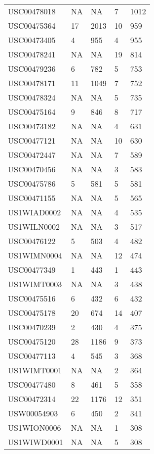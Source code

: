 \begin{center}
\begin{longtable}{l l l l l}
				\endfoot
					\hline
				\endlastfoot
				  USC00478018 & NA & NA &   7 & 1012 \\ 
				  USC00475364 &  17 & 2013 &  10 & 959 \\ 
				  USC00473405 &   4 & 955 &   4 & 955 \\ 
				  USC00478241 & NA & NA &  19 & 814 \\ 
				  USC00479236 &   6 & 782 &   5 & 753 \\ 
				  USC00478171 &  11 & 1049 &   7 & 752 \\ 
				  USC00478324 & NA & NA &   5 & 735 \\ 
				  USC00475164 &   9 & 846 &   8 & 717 \\ 
				  USC00473182 & NA & NA &   4 & 631 \\ 
				  USC00477121 & NA & NA &  10 & 630 \\ 
				  USC00472447 & NA & NA &   7 & 589 \\ 
				  USC00470456 & NA & NA &   3 & 583 \\ 
				  USC00475786 &   5 & 581 &   5 & 581 \\ 
				  USC00471155 & NA & NA &   5 & 565 \\ 
				  US1WIAD0002 & NA & NA &   4 & 535 \\ 
				  US1WILN0002 & NA & NA &   3 & 517 \\ 
				  USC00476122 &   5 & 503 &   4 & 482 \\ 
				  US1WIMN0004 & NA & NA &  12 & 474 \\ 
				  USC00477349 &   1 & 443 &   1 & 443 \\ 
				  US1WIMT0003 & NA & NA &   3 & 438 \\ 
				  USC00475516 &   6 & 432 &   6 & 432 \\ 
				  USC00475178 &  20 & 674 &  14 & 407 \\ 
				  USC00470239 &   2 & 430 &   4 & 375 \\ 
				  USC00475120 &  28 & 1186 &   9 & 373 \\ 
				  USC00477113 &   4 & 545 &   3 & 368 \\ 
				  US1WIMT0001 & NA & NA &   2 & 364 \\ 
				  USC00477480 &   8 & 461 &   5 & 358 \\ 
				  USC00472314 &  22 & 1176 &  12 & 351 \\ 
				  USW00054903 &   6 & 450 &   2 & 341 \\ 
				  US1WION0006 & NA & NA &   1 & 308 \\ 
				  US1WIWD0001 & NA & NA &   5 & 308 \\ 

\end{longtable}
\end{center}

